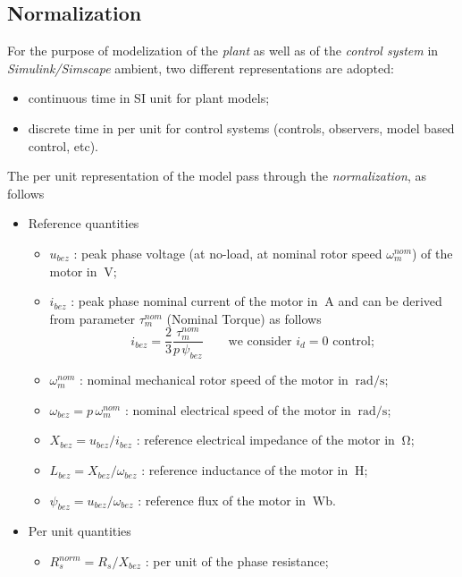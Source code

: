 \documentclass[11pt,a4paper]{article}
\numberwithin{equation}{section}
\theoremstyle{it}
\theoremstyle{definition}
\begin{document}
\begin{onehalfspace}
\subsection{Normalization}	
For the purpose of modelization of the \textit{plant} as well as of the \textit{control system} in \textit{Simulink/Simscape} ambient, two different representations are adopted:
\begin{itemize}
	\item[--] continuous time in SI unit for plant models;
	\item[--] discrete time in per unit for control systems (controls, observers, model based control, etc).	
\end{itemize}

The per unit representation of the model pass through the \textit{normalization}, as follows
\begin{itemize}
	\item[--] Reference quantities
	\begin{itemize}
		\item[--] $u_{bez}$ : peak phase voltage (at no-load, at nominal rotor speed $\omega_m^{nom}$) of the motor in $\SI{}{\volt}$;
		\item[--] $i_{bez}$ : peak phase nominal current of the motor in $\SI{}{\ampere}$ and can be derived from parameter $\tau_m^{nom}$ (Nominal Torque) as follows
		\begin{equation}
			i_{bez} = \frac{2}{3}\frac{\tau_m^{nom}}{p\,\psi_{bez}} \qquad\text{we consider $i_d=0$ control};
		\end{equation}
		\item[--] $\omega_m^{nom}$ : nominal mechanical rotor speed of the motor in $\SI{}{\radian\per\second}$;
		\item[--] $\omega_{bez} = p\,\omega_m^{nom}$ : nominal electrical speed of the motor in $\SI{}{\radian\per\second}$;
		\item[--] $X_{bez} = u_{bez}/i_{bez}$ : reference electrical impedance of the motor in $\SI{}{\ohm}$;
		\item[--] $L_{bez} = X_{bez}/\omega_{bez}$ : reference inductance of the motor in $\SI{}{\henry}$;
		\item[--] $\psi_{bez} = u_{bez}/\omega_{bez}$ : reference flux of the motor in $\SI{}{\weber}$.
	\end{itemize}
	\item[--] Per unit quantities
	\begin{itemize}
		\item[--] $R_s^{norm} = R_s/X_{bez}$ : per unit of the phase resistance;

\end{itemize}
\end{itemize}
\end{onehalfspace}
\end{document}
